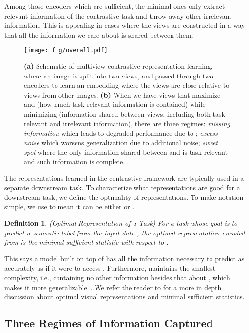\documentclass{article}
\newtheorem{definition}{Definition}
\begin{document}
\noindent Among those encoders which are sufficient, the minimal ones only extract relevant information of the contrastive task and throw away other irrelevant information. This is appealing in cases where the views are constructed in a way that all the information we care about is shared between them. 



\begin{figure}[t]
\centering
\small
\texttt{[image: fig/overall.pdf]}
\caption{\small {\bf(a)} Schematic of multiview contrastive representation learning, where an image is split into two views, and passed through two encoders to learn an embedding where the views are close relative to views from other images. {\bf(b)} When we have views that maximize  and  (how much task-relevant information is contained) while minimizing  (information shared between views, including both task-relevant and irrelevant information), there are three regimes: \emph{missing information} which leads to degraded performance due to ; \emph{excess noise} which worsens generalization due to additional noise; \emph{sweet spot} where the only information shared between  and  is task-relevant and such information is complete. }
\vspace{-10pt}
\label{fig:schematic1}
\end{figure} 
The representations learned in the contrastive framework are typically used in a separate downstream task. To characterize what representations are good for a downstream task, we define the optimality of representations. To make notation simple, we use  to mean it can be either  or .
\begin{definition}\label{def:optimal_rep_for_task}
(Optimal Representation of a Task) For a task  whose goal is to predict a semantic label  from the input data , the optimal representation  encoded from  is the minimal sufficient statistic with respect to .
\end{definition}


\noindent This says a model built on top of  has all the information necessary to predict  as accurately as if it were to access . Furthermore,  maintains the smallest complexity, i.e., containing no other information besides that about , which makes it more generalizable~\cite{soatto2014visual}. We refer the reader to \cite{soatto2014visual} for a more in depth discussion about optimal visual representations and minimal sufficient statistics.


\subsection{Three Regimes of Information Captured}\label{sec:three_phase}
\end{document}
